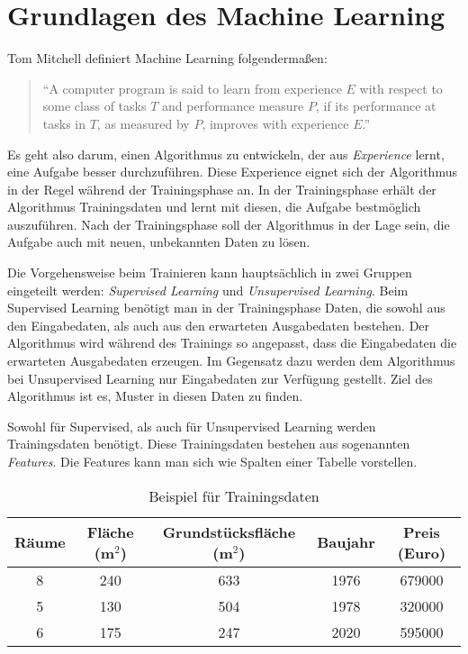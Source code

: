 
\chapter{Grundlagen des Machine Learning}

Tom Mitchell definiert Machine Learning folgendermaßen:
\begin{quote}
    \enquote{A computer program is said to learn from experience $E$ with respect to some class of tasks $T$ and performance measure $P$, if its performance at tasks in $T$, as measured by $P$, improves with experience $E$.} \cite{mitchell1997}
\end{quote}

Es geht also darum, einen Algorithmus zu entwickeln, der aus \textit{Experience} lernt, eine Aufgabe besser durchzuführen. Diese Experience eignet sich der Algorithmus in der Regel während der Trainingsphase an. In der Trainingsphase erhält der Algorithmus Trainingsdaten und lernt mit diesen, die Aufgabe bestmöglich auszuführen. Nach der Trainingsphase soll der Algorithmus in der Lage sein, die Aufgabe auch mit neuen, unbekannten Daten zu lösen.

Die Vorgehensweise beim Trainieren kann hauptsächlich in zwei Gruppen eingeteilt werden: \textit{Supervised Learning} und \textit{Unsupervised Learning}. Beim Supervised Learning benötigt man in der Trainingsphase Daten, die sowohl aus den Eingabedaten, als auch aus den erwarteten Ausgabedaten bestehen. Der Algorithmus wird während des Trainings so angepasst, dass die Eingabedaten die erwarteten Ausgabedaten erzeugen. Im Gegensatz dazu werden dem Algorithmus bei Unsupervised Learning nur Eingabedaten zur Verfügung gestellt. Ziel des Algorithmus ist es, Muster in diesen Daten zu finden.

Sowohl für Supervised, als auch für Unsupervised Learning werden Trainingsdaten benötigt. Diese Trainingsdaten bestehen aus sogenannten \textit{Features}. Die Features kann man sich wie Spalten einer Tabelle vorstellen.

\begin{table}[H]
    \centering
    \begin{tabular}{ || c | c | c | c || c || }
        \hline
        Räume & Fläche (m$^2$) & Grundstücksfläche (m$^2$) & Baujahr & Preis (Euro) \\
        \hline
        8 & 240 & 633 & 1976 & 679000 \\
        5 & 130 & 504 & 1978 & 320000 \\
        6 & 175 & 247 & 2020 & 595000 \\
        \hline
    \end{tabular}
    \caption{Beispiel für Trainingsdaten}
    \label{tbl:trainingdata}
\end{table}


